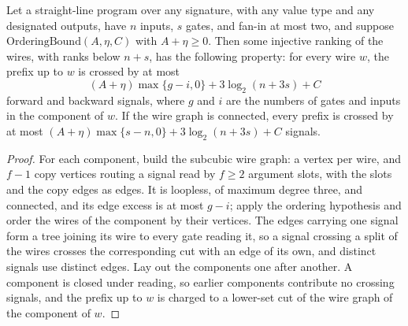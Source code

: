 \begin{theorem}
  \label{thm:lowerbounds-algebraic-multi-output-ordering}
  \leanok
  Let a straight-line program over any signature, with any value type and
  any designated outputs, have $n$ inputs, $s$ gates, and fan-in at most
  two, and suppose $\mathrm{OrderingBound}(A,\eta,C)$ with $A+\eta\ge0$.
  Then some injective ranking of the wires, with ranks below $n+s$, has the
  following property: for every wire $w$, the prefix up to $w$ is crossed
  by at most
  \[
    (A+\eta)\max\{g-i,0\} + 3\log_2(n+3s) + C
  \]
  forward and backward signals, where $g$ and $i$ are the numbers of gates
  and inputs in the component of $w$. If the wire graph is connected, every
  prefix is crossed by at most $(A+\eta)\max\{s-n,0\}+3\log_2(n+3s)+C$
  signals.
\end{theorem}
\begin{proof}
  \leanok
  For each component, build the subcubic wire graph: a vertex per wire, and
  $f-1$ copy vertices routing a signal read by $f\ge2$ argument slots, with
  the slots and the copy edges as edges. It is loopless, of maximum degree
  three, and connected, and its edge excess is at most $g-i$; apply the
  ordering hypothesis and order the wires of the component by their
  vertices. The edges carrying one signal form a tree joining its wire to
  every gate reading it, so a signal crossing a split of the wires crosses
  the corresponding cut with an edge of its own, and distinct signals use
  distinct edges. Lay out the components one after another. A component is
  closed under reading, so earlier components contribute no crossing
  signals, and the prefix up to $w$ is charged to a lower-set cut of the
  wire graph of the component of $w$.
\end{proof}

